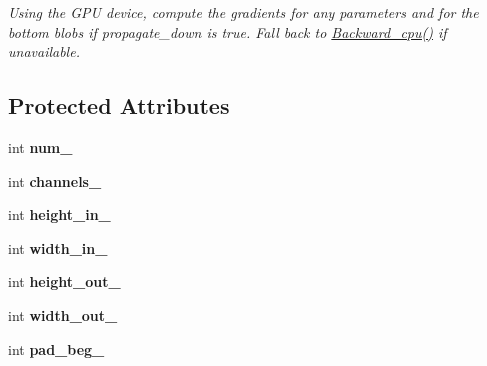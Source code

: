 \begin{DoxyCompactItemize}
\begin{DoxyCompactList}\small\item\em Using the G\+PU device, compute the gradients for any parameters and for the bottom blobs if propagate\+\_\+down is true. Fall back to \hyperlink{classcaffe_1_1InterpLayer_a968eb0a3ad8875fb584a8ff01c66de35}{Backward\+\_\+cpu()} if unavailable. \end{DoxyCompactList}\end{DoxyCompactItemize}
\subsection*{Protected Attributes}
\begin{DoxyCompactItemize}
\item 
int {\bfseries num\+\_\+}\hypertarget{classcaffe_1_1InterpLayer_a5f72bd111cf142dbcaf87a86f54f202b}{}\label{classcaffe_1_1InterpLayer_a5f72bd111cf142dbcaf87a86f54f202b}

\item 
int {\bfseries channels\+\_\+}\hypertarget{classcaffe_1_1InterpLayer_a9e19fb656adcbee9dd2b068750f14e0f}{}\label{classcaffe_1_1InterpLayer_a9e19fb656adcbee9dd2b068750f14e0f}

\item 
int {\bfseries height\+\_\+in\+\_\+}\hypertarget{classcaffe_1_1InterpLayer_a83a605d3049ea90e65fc4c7624234f0a}{}\label{classcaffe_1_1InterpLayer_a83a605d3049ea90e65fc4c7624234f0a}

\item 
int {\bfseries width\+\_\+in\+\_\+}\hypertarget{classcaffe_1_1InterpLayer_a4367548d13a21b39bc205f7a8531b1ad}{}\label{classcaffe_1_1InterpLayer_a4367548d13a21b39bc205f7a8531b1ad}

\item 
int {\bfseries height\+\_\+out\+\_\+}\hypertarget{classcaffe_1_1InterpLayer_a4625f8e427b9acdeaa4e3792cbbf9648}{}\label{classcaffe_1_1InterpLayer_a4625f8e427b9acdeaa4e3792cbbf9648}

\item 
int {\bfseries width\+\_\+out\+\_\+}\hypertarget{classcaffe_1_1InterpLayer_a02c2c7a789cb27a6bf9b078056b3c22f}{}\label{classcaffe_1_1InterpLayer_a02c2c7a789cb27a6bf9b078056b3c22f}

\item 
int {\bfseries pad\+\_\+beg\+\_\+}\hypertarget{classcaffe_1_1InterpLayer_a8371c85539d8d1cbcb01f6613fe1dceb}{}\label{classcaffe_1_1InterpLayer_a8371c85539d8d1cbcb01f6613fe1dceb}


\end{DoxyCompactItemize}
